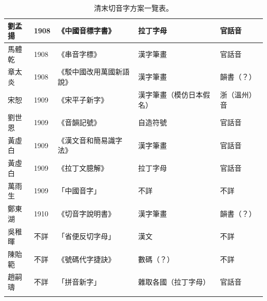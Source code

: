 \documentclass[a5paper, 12pt, openany]{book} %
\begin{document}
\begin{longtable}{|p{1.3cm}|p{1cm}|p{2.5cm}|p{2cm}|p{2cm}|}
  劉孟揚 & 1908 & 《中國音標字書》 & 拉丁字母 & 官話音 \\ \hline
  馬體乾 & 1908 & 《串音字標》 & 漢字筆畫 & 官話音 \\ \hline
  章太炎 & 1908 & 《駁中國改用萬國新語說》 & 漢字筆畫 & 韻書（？） \\ \hline
  宋恕 & 1909 & 《宋平子新字》 & 漢字筆畫（模仿日本假名） & 浙（溫州）音 \\ \hline
  劉世恩 & 1909 & 《音韻記號》 & 自造符號 & 官話音 \\ \hline
  黃虛白 & 1909 & 《漢文音和簡易識字法》 & 漢字筆畫 & 官話音 \\ \hline
  黃虛白 & 1909 & 《拉丁文臆解》 & 拉丁字母 & 官話音 \\ \hline
  萬雨生 & 1909 & 「中國音字」 & 不詳 & 不詳 \\ \hline
  鄭東湖 & 1910 & 《切音字說明書》 & 漢字筆畫 & 韻書（？） \\ \hline
  吳稚暉 & 不詳 & 「省便反切字母」 & 漢文 & 不詳 \\ \hline
  陳貽範 & 不詳 & 《號碼代字捷訣》 & 數碼（？） & 不詳 \\ \hline
  趙嗣璹 & 不詳 & 「拼音新字」 & 雜取各國（拉丁字母） & 官話音 \\ \hline
\caption{清末切音字方案一覽表。}
  \label{tab:phonetic_reform}
\end{longtable}
\end{document}
